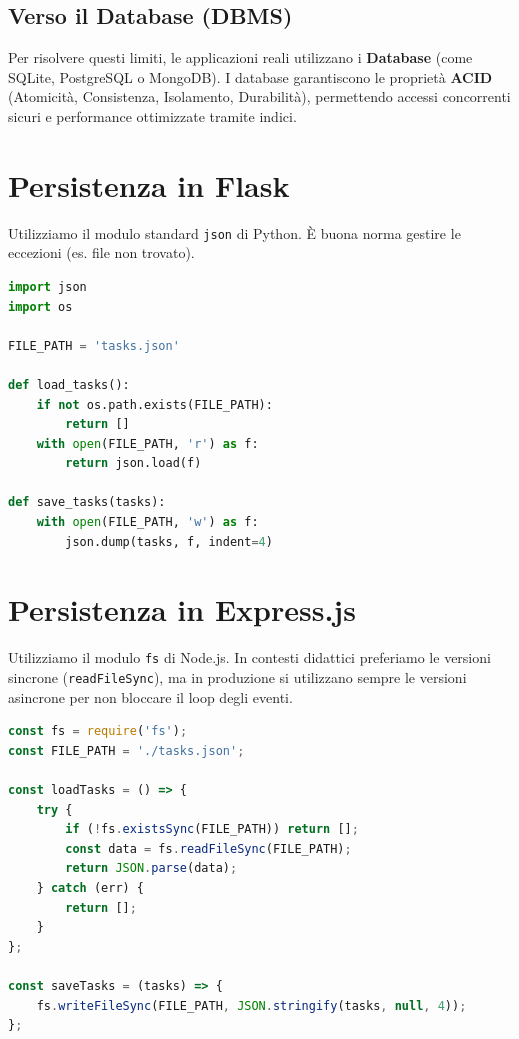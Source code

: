 \documentclass[11pt,a4paper]{report}
\begin{document}
\subsection*{Verso il Database (DBMS)}
Per risolvere questi limiti, le applicazioni reali utilizzano i \textbf{Database} (come SQLite, PostgreSQL o MongoDB). I database garantiscono le proprietà \textbf{ACID} (Atomicità, Consistenza, Isolamento, Durabilità), permettendo accessi concorrenti sicuri e performance ottimizzate tramite indici.

\section{Persistenza in Flask}
Utilizziamo il modulo standard \texttt{json} di Python. \`E buona norma gestire le eccezioni (es. file non trovato).

\begin{lstlisting}[language=python, caption=Gestione JSON in Flask]
import json
import os

FILE_PATH = 'tasks.json'

def load_tasks():
    if not os.path.exists(FILE_PATH):
        return []
    with open(FILE_PATH, 'r') as f:
        return json.load(f)

def save_tasks(tasks):
    with open(FILE_PATH, 'w') as f:
        json.dump(tasks, f, indent=4)
\end{lstlisting}

\section{Persistenza in Express.js}
Utilizziamo il modulo \texttt{fs} di Node.js. In contesti didattici preferiamo le versioni sincrone (\texttt{readFileSync}), ma in produzione si utilizzano sempre le versioni asincrone per non bloccare il loop degli eventi.

\begin{lstlisting}[language=javascript, caption=Gestione JSON in Express]
const fs = require('fs');
const FILE_PATH = './tasks.json';

const loadTasks = () => {
    try {
        if (!fs.existsSync(FILE_PATH)) return [];
        const data = fs.readFileSync(FILE_PATH);
        return JSON.parse(data);
    } catch (err) {
        return [];
    }
};

const saveTasks = (tasks) => {
    fs.writeFileSync(FILE_PATH, JSON.stringify(tasks, null, 4));
};
\end{lstlisting}
\end{document}
